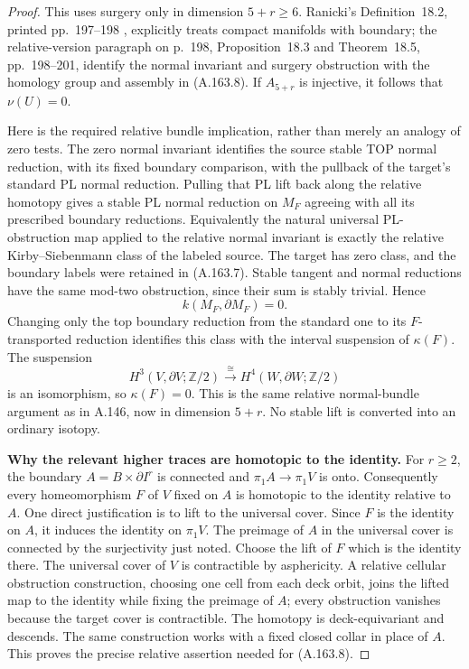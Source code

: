 \begin{proof}
This uses surgery only in dimension $5+r\ge6$. Ranicki's
Definition~18.2, printed pp.~197--198 \cite{Ranicki1992TopologicalManifolds}, explicitly treats compact
manifolds with boundary; the relative-version paragraph on p.~198,
Proposition~18.3 and Theorem~18.5, pp.~198--201, identify the normal
invariant and surgery obstruction with the homology group and
assembly in (A.163.8). If $A_{5+r}$ is injective, it follows that
$\nu(U)=0$.

Here is the required relative bundle implication, rather than merely
an analogy of zero tests. The zero normal invariant identifies the
source stable TOP normal reduction, with its fixed boundary
comparison, with the pullback of the target's standard PL normal
reduction. Pulling that PL lift back along the relative homotopy gives
a stable PL normal reduction on $M_F$ agreeing with all its prescribed
boundary reductions. Equivalently the natural universal PL-obstruction
map applied to the relative normal invariant is exactly the relative
Kirby--Siebenmann class of the labeled source. The target has zero
class, and the boundary labels were retained in (A.163.7). Stable tangent
and normal reductions have the same mod-two obstruction, since their
sum is stably trivial. Hence
\[
 k(M_F,\partial M_F)=0.
\]
Changing only the top boundary reduction from the standard one to its
$F$-transported reduction identifies this class with the interval
suspension of $\kappa(F)$. The suspension
\[
 H^3(V,\partial V;\mathbb Z/2)
       \xrightarrow{\cong}H^4(W,\partial W;\mathbb Z/2)
\]
is an isomorphism, so $\kappa(F)=0$. This is the same relative
normal-bundle argument as in A.146, now in dimension $5+r$.
No stable lift is converted into an ordinary isotopy.

\textbf{Why the relevant higher traces are homotopic to the identity.}
For $r\ge2$, the boundary $A=B\times\partial I^r$ is connected and
$\pi_1A\to\pi_1V$ is onto. Consequently every homeomorphism $F$ of
$V$ fixed on $A$ is homotopic to the identity relative to $A$.
One direct justification is to lift to the universal cover. Since
$F$ is the identity on $A$, it induces the identity on $\pi_1V$.
The preimage of $A$ in the universal cover is connected by the
surjectivity just noted. Choose the lift of $F$ which is the identity
there. The universal cover of $V$ is contractible by asphericity.
A relative cellular obstruction construction, choosing one cell from
each deck orbit, joins the lifted map to the identity while fixing
the preimage of $A$; every obstruction vanishes because the target
cover is contractible. The homotopy is deck-equivariant and descends.
The same construction works with a fixed closed collar in place of
$A$. This proves the precise relative assertion needed for (A.163.8).


\end{proof}
